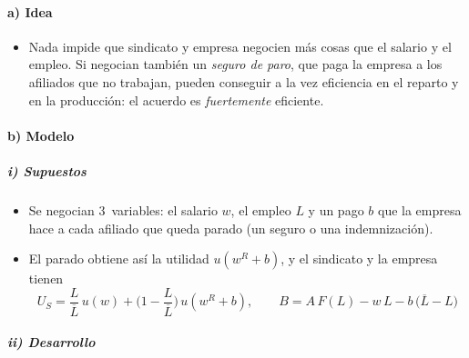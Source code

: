\documentclass[11pt]{article}
\begin{document}
\paragraph{a) Idea}

\begin{itemize}
\item Nada impide que sindicato y empresa negocien más cosas que el salario y el empleo. Si negocian también un \emph{seguro de paro}, que paga la empresa a los afiliados que no trabajan, pueden conseguir a la vez eficiencia en el reparto y en la producción: el acuerdo es \emph{fuertemente} eficiente\nocite{Booth1995Layoffs,Cahuc2014Labor}.
\end{itemize}

\paragraph{b) Modelo}

\subparagraph{i) Supuestos}

\begin{itemize}
\item Se negocian 3~variables: el salario $w$, el empleo $L$ y un pago $b$ que la empresa hace a cada afiliado que queda parado (un seguro o una indemnización).
\item El parado obtiene así la utilidad $u(w^R+b)$, y el sindicato y la empresa tienen
  \begin{equation}
  U_S=\frac{L}{\overline{L}}\,u(w)+\Big(1-\frac{L}{\overline{L}}\Big)\,u(w^R+b),\qquad B=A\,F(L)-w\,L-b\,\big(\overline{L}-L\big) \label{eq:fuertemente-eficientes}
  \end{equation}
\end{itemize}

\subparagraph{ii) Desarrollo}
\end{document}
